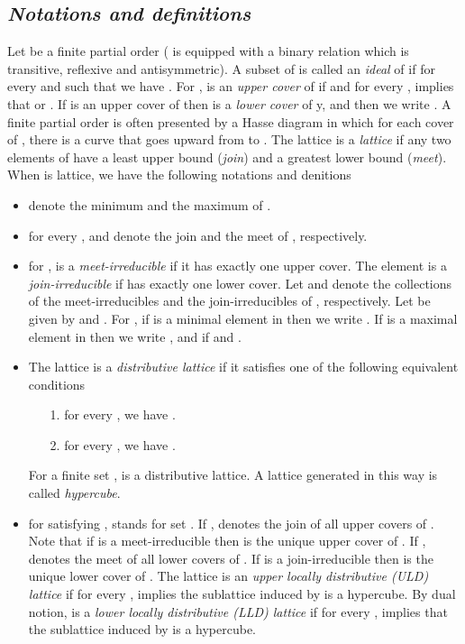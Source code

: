 \documentclass{article}
\theoremstyle{definition}
\begin{document}
\subsection{\small \textit{Notations and definitions}}
\hspace{1.ex}Let  be a finite partial order ( is equipped with a binary relation  which is transitive, reflexive and antisymmetric). A subset  of  is called an \emph{ideal} of  if for every  and  such that  we have . For ,  is an \emph{upper cover} of  if  and for every ,  implies that  or . If  is an upper cover of  then  is a \emph{lower cover} of y, and then we write . A finite partial order is often presented by a Hasse diagram in which for each cover  of , there is a curve that goes upward from  to . The lattice  is a \emph{lattice} if any two elements of  have a least upper bound (\emph{join}) and a greatest lower bound (\emph{meet}). When  is lattice, we have the following notations and denitions
\begin{itemize}
  \item  denote the minimum and the maximum of . 
  \item for every ,  and  denote the join and the meet of , respectively. 
  \item for ,  is a \emph{meet-irreducible} if it has exactly one upper cover. The element  is a \emph{join-irreducible} if  has exactly one lower cover. Let  and  denote the collections of the meet-irreducibles and the join-irreducibles of , respectively. Let  be given by  and . For , if  is a minimal element in  then we write . If  is a maximal element in  then we write , and  if  and . 
  \item The lattice  is a \emph{distributive lattice} if it satisfies one of the following equivalent conditions
       \begin{itemize}
         \item[1. ] for every , we have . 
         \item[2. ] for every , we have .
       \end{itemize}  
For a finite set ,  is a distributive lattice. A lattice generated in this way is called \emph{hypercube}. 
 \item for  satisfying ,  stands for set . If ,  denotes the join of all upper covers of . Note that if  is a meet-irreducible then  is the unique upper cover of . If ,  denotes the meet of all lower covers of . If  is a join-irreducible then  is the unique lower cover of . The lattice  is an \emph{upper locally distributive (ULD) lattice} \cite{M90,D40} if for every ,  implies the sublattice induced by  is a hypercube. By dual notion,  is a \emph{lower locally distributive (LLD) lattice} if for every ,  implies that the sublattice induced by  is a hypercube.
\end{itemize}  
\end{document}
